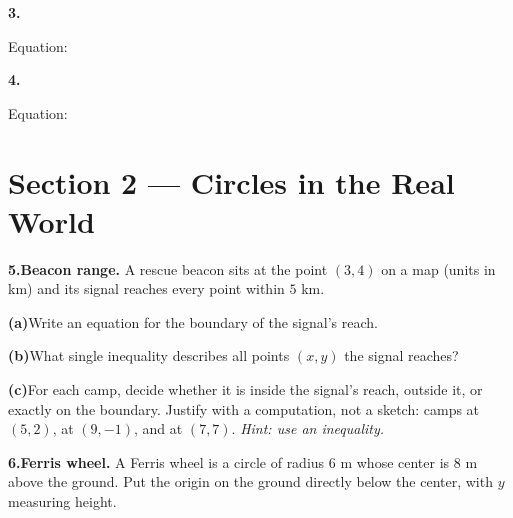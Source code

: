 \documentclass[12pt]{article}
\newcommand{\gridaxes}[1]{%
  \draw[step=1,gray!25,very thin] (-#1,-#1) grid (#1,#1);%
  \draw[thick,->] (-#1-0.4,0)--(#1+0.4,0) node[right]{\scriptsize$x$};%
  \draw[thick,->] (0,-#1-0.4)--(0,#1+0.4) node[above]{\scriptsize$y$};%
  \foreach \n in {-#1,...,#1}{\ifnum\n=0\else
      \draw (\n,0.07)--(\n,-0.07) node[below]{\tiny$\n$};
      \draw (0.07,\n)--(-0.07,\n) node[left]{\tiny$\n$};\fi}%
}
\begin{document}
\medskip
\begin{minipage}[t]{0.48\linewidth}
\textbf{3.}\\[2pt]
\centering
{}
\par\vspace{9mm}\raggedright Equation: \underline{\hspace{4.5cm}}
\end{minipage}\hfill
\begin{minipage}[t]{0.48\linewidth}
\textbf{4.}\\[2pt]
\centering
{}
\par\vspace{9mm}\raggedright Equation: \underline{\hspace{4.5cm}}
\end{minipage}

\newpage
\section*{Section 2 --- Circles in the Real World}

\textbf{5.}\quad \textbf{Beacon range.} A rescue beacon sits at the point $(3,4)$ on a map (units in km) and its signal reaches every point within $5$ km.

\medskip
\textbf{(a)}\quad Write an equation for the boundary of the signal's reach.

\vspace{2.5cm}
\textbf{(b)}\quad What single inequality describes all points $(x,y)$ the signal reaches?

\vspace{5.5cm}
\textbf{(c)}\quad For each camp, decide whether it is inside the signal's reach, outside it, or exactly on the boundary. Justify with a computation, not a sketch: camps at $(5,2)$, at $(9,-1)$, and at $(7,7)$. \textit{Hint: use an inequality.}

\vspace{2cm}

\newpage
\textbf{6.}\quad \textbf{Ferris wheel.} A Ferris wheel is a circle of radius $6$ m whose center is $8$ m above the ground. Put the origin on the ground directly below the center, with $y$ measuring height.
\end{document}
